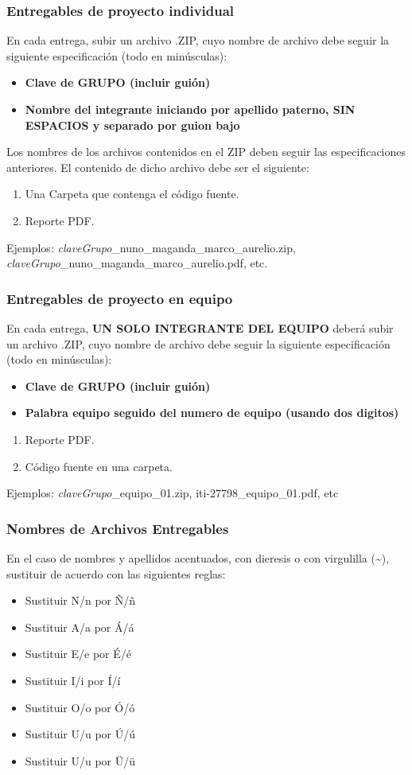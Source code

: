 \begin{frame}
\frametitle{Entregables de proyecto individual}
En cada entrega, subir un archivo .ZIP, cuyo nombre de archivo debe seguir la siguiente especificación (todo en minúsculas):
\begin{itemize}
\item \textbf{Clave de GRUPO (incluir guión)}
\item \textbf{Nombre del integrante iniciando por apellido paterno, SIN ESPACIOS y separado por guion bajo}
\end{itemize}
Los nombres de los archivos contenidos en el ZIP deben seguir las especificaciones anteriores. El contenido de dicho archivo debe ser el siguiente:
\begin{enumerate}
\item Una Carpeta que contenga el código fuente. 
\item Reporte PDF. 
\end{enumerate}
Ejemplos: 
\textit{claveGrupo}\_nuno\_maganda\_marco\_aurelio.zip,  \textit{claveGrupo}\_nuno\_maganda\_marco\_aurelio.pdf, etc. 
\end{frame}



\begin{frame}
\frametitle{Entregables de proyecto en equipo}
En cada entrega, \textbf{UN SOLO INTEGRANTE DEL EQUIPO} deberá subir un archivo .ZIP, cuyo nombre de archivo debe seguir la siguiente especificación (todo en minúsculas):
\begin{itemize}
\item \textbf{Clave de GRUPO (incluir guión)}
\item \textbf{Palabra equipo seguido del numero de equipo (usando dos digitos)}
\end{itemize}

\begin{enumerate}
\item Reporte PDF.
\item Código fuente en una carpeta.
\end{enumerate}
Ejemplos: \textit{claveGrupo}\_equipo\_01.zip, iti-27798\_equipo\_01.pdf, etc
\end{frame}

\begin{frame}
\frametitle{Nombres de Archivos Entregables}
En el caso de nombres y apellidos acentuados, con dieresis o con virgulilla (\textasciitilde{}), sustituir de acuerdo con las siguientes reglas:
\begin{itemize}
\item Sustituir N/n por \~N/\~n
\item Sustituir A/a por \'A/\'a
\item Sustituir E/e por \'E/\'e
\item Sustituir I/i por \'I/\'i
\item Sustituir O/o por \'O/\'o
\item Sustituir U/u por \'U/\'u
\item Sustituir U/u por \"U/\"u
\end{itemize}
\end{frame}
